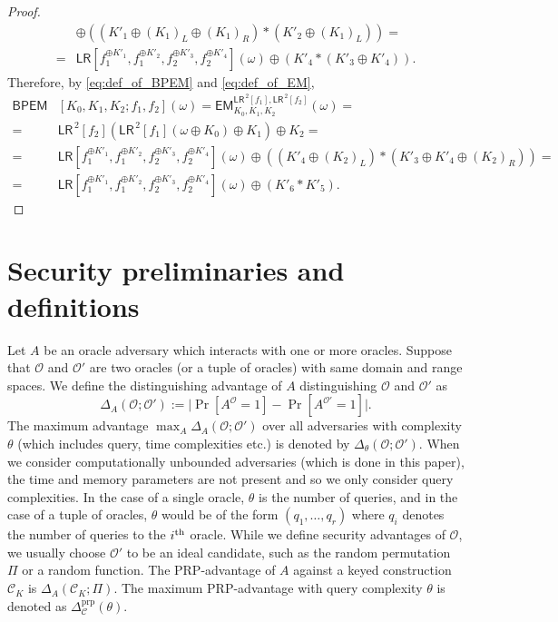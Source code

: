 \documentclass{llncs}
\newcommand{\tx}{\textsf}
\begin{document}
\begin{proof}
\begin{align*}
&\oplus\left((K'_1\oplus(K_1)_L\oplus(K_1)_R)*(K'_2\oplus(K_1)_L)\right)=\\
=&\tx{LR}\left[f_1^{\oplus K'_1},f_1^{\oplus K'_2},f_2^{\oplus K'_3},f_2^{\oplus K'_4}\right](\omega)\oplus\left(K'_4*(K'_3\oplus K'_4)\right).
\end{align*}
Therefore, by \eqref{eq:def_of_BPEM} and \eqref{eq:def_of_EM},
\begin{align*}
\tx{BPEM}&\left[K_0, K_1, K_2;f_1,f_2\right](\omega)=\tx{EM}^{\tx{LR}^{\,2}[f_1],\tx{LR}^{\,2}[f_2]}_{K_0, K_1, K_2}(\omega)=\\
=&\tx{LR}^{\,2}[f_2]\left(\tx{LR}^{\,2}[f_1](\omega\oplus K_0)\oplus K_1\right)\oplus K_2=\\
=&\tx{LR}\left[f_1^{\oplus K'_1},f_1^{\oplus K'_2},f_2^{\oplus K'_3},f_2^{\oplus K'_4}\right](\omega)\oplus\left((K'_4\oplus(K_2)_L)*(K'_3\oplus K'_4\oplus(K_2)_R)\right)=\\
=& \tx{LR}\left[f_1^{\oplus K'_1}, f_1^{\oplus K'_2}, f_2^{\oplus K'_3}, f_2^{\oplus K'_4}\right](\omega) \oplus (K'_6 * K'_5).
\end{align*}
\end{proof}

\section{Security preliminaries and definitions}
\label{sec:prelim}
Let $A$ be an oracle adversary which interacts with one or more oracles.
Suppose that $\mathcal{O}$ and $\mathcal{O}'$ are two oracles (or a tuple of oracles) with same domain and range spaces. We define the distinguishing advantage of $A$ distinguishing $\mathcal{O}$ and $\mathcal{O}'$ as
$$\Delta_{A}(\mathcal{O} ;\mathcal{O}') := \big|\Pr[A^{\mathcal{O}} = 1] - \Pr[A^{\mathcal{O'}} = 1]\big|.$$
The maximum advantage $\max_{A} \Delta_{A}(\mathcal{O} ; \mathcal{O}')$ over all adversaries with complexity $\theta$ (which includes query, time complexities etc.) is denoted by $\Delta_{\theta}(\mathcal{O};\mathcal{O}')$. When we consider computationally unbounded adversaries (which is done in this paper), the time and memory parameters are not present and so we only consider query complexities.
In the case of a single oracle, $\theta$ is the number of queries, and in the case of a tuple of oracles, $\theta$ would be of the form $(q_1, \ldots, q_r)$ where $q_i$ denotes the number of queries to the $i^{\rm{th}}$ oracle.
While we define security advantages of $\mathcal{O}$, we usually choose $\mathcal{O}'$ to be an ideal candidate, such as the random permutation $\Pi$ or a random function.
The PRP-advantage of $A$ against a keyed construction $\mathcal{C}_K$ is $\Delta_{A}(\mathcal{C}_K ; \Pi)$. The maximum PRP-advantage with query complexity $\theta$ is denoted as $\Delta_{\mathcal{C}}^{\mathrm{prp}}(\theta)$.
\end{document}
